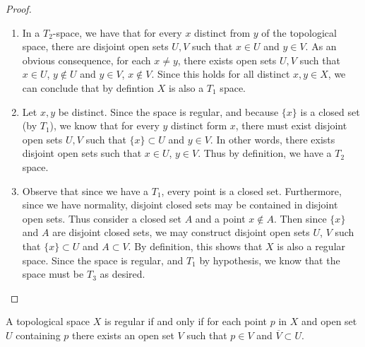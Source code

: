 \documentclass[a4paper,12pt,twoside]{hmcpset}
\begin{document}
\begin{proof}
    \begin{enumerate}
        \item In a $T_2$-space, we have that for every $x$ distinct from $y$
        of the topological space, there are disjoint open sets $U, V$ such
        that $x \in U$ and $y \in V$. As an obvious consequence,
        for each $x \ne y$, there exists open sets $U, V$ such that 
        $x \in U$, $y \notin U$ and $y \in V$, $x \notin V$.
        Since this holds for all distinct $x, y \in X$, we can
        conclude that by defintion $X$ is also a $T_1$ space.

        \item Let $x, y$ be distinct. Since the space
        is 
        regular, and because $\{x\}$ is a closed set (by $T_1$), we know that for
        every $y$ distinct form $x$, there must exist disjoint open sets
        $U, V$ such that $\{x\} \subset U$ and $y \in V$. In other
        words, there exists disjoint open sets such that $x \in U$, $y
        \in V$. Thus by
        definition, we have a $T_2$ space.

        \item Observe that since we have a $T_1$, every point is a
        closed set.
        Furthermore, since we have normality, disjoint closed sets may be
        contained in disjoint open sets. Thus consider a closed set $A$
        and a point $x \notin A.$ Then since $\{x\}$ and $A$ are disjoint
        closed sets, we may construct disjoint open sets $U$, $V$ such
        that $\{x\} \subset U$ and $A \subset V$. By definition, this
        shows that $X$ is also a regular space. Since the space is
        regular, and $T_1$ by hypothesis, we know that the space must
        be $T_3$ as desired.
    
        
    \end{enumerate}

\end{proof}

\begin{problem}[Theorem 5.8] A topological space $X$ is regular if and
    only if for each point $p$ in $X$ and open set $U$ containing $p$
    there exists an open set $V$ such that $p \in V$ and $\overline{V}
    \subset U$.
\end{problem}
\end{document}
